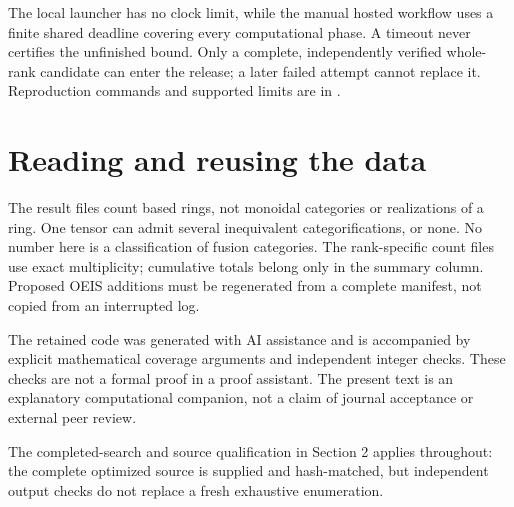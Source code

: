 \documentclass[11pt,a4paper]{article}
\theoremstyle{definition}\newtheorem{definition}[theorem]{Definition}\newtheorem{remark}[theorem]{Remark}
\begin{document}
The local launcher has no clock limit, while the manual hosted workflow uses a
finite shared deadline covering every computational phase. A timeout never
certifies the unfinished bound. Only a complete, independently verified whole-rank
candidate can enter the release; a later failed attempt cannot replace it.
Reproduction commands and supported limits are in .

\section{Reading and reusing the data}
The result files count based rings, not monoidal categories or realizations of
a ring. One tensor can admit several inequivalent categorifications, or none.
No number here is a classification of fusion categories. The rank-specific
count files use exact multiplicity; cumulative totals belong only in the
summary column. Proposed OEIS additions must be regenerated from a complete
manifest, not copied from an interrupted log.

The retained code was generated with AI assistance and is accompanied by explicit
mathematical coverage arguments and independent integer checks. These checks
are not a formal proof in a proof assistant. The present text is an explanatory
computational companion, not a claim of journal acceptance or external peer review.

The completed-search and source qualification in Section 2 applies throughout: the complete optimized source is supplied and hash-matched, but independent output checks do not replace a fresh exhaustive enumeration.
\end{document}
